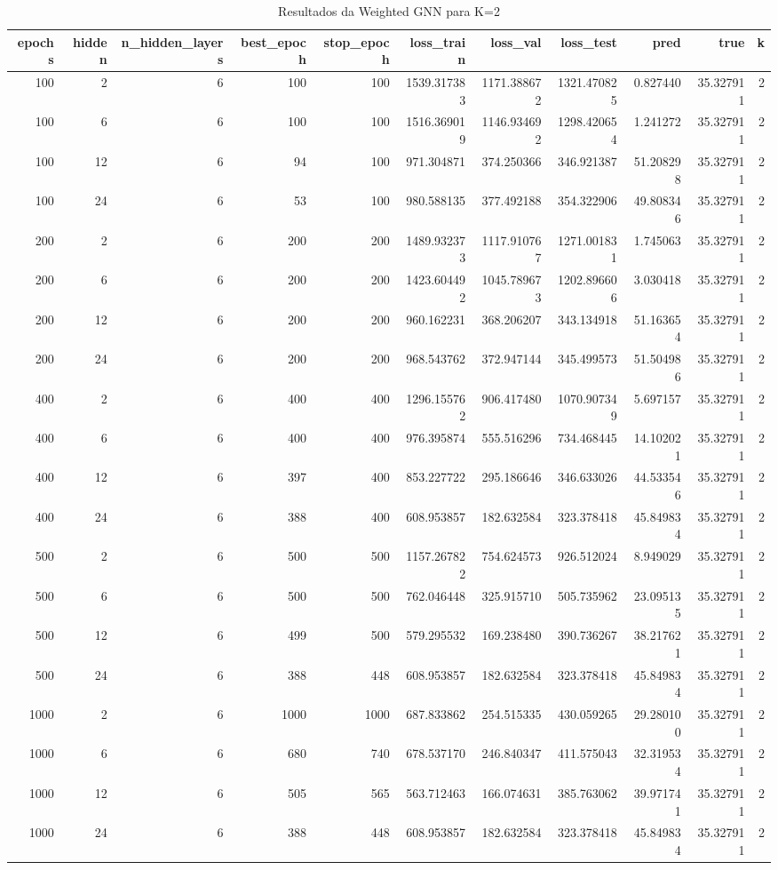\begin{table}
\caption{Resultados da Weighted GNN para K=2}
\label{tab:weighted_gnn_results_k2}
\begin{tabular}{rrrrrrrrrrr}
\toprule
epochs & hidden & n\_hidden\_layers & best\_epoch & stop\_epoch & loss\_train & loss\_val & loss\_test & pred & true & k \\
\midrule
100 & 2 & 6 & 100 & 100 & 1539.317383 & 1171.388672 & 1321.470825 & 0.827440 & 35.327911 & 2 \\
100 & 6 & 6 & 100 & 100 & 1516.369019 & 1146.934692 & 1298.420654 & 1.241272 & 35.327911 & 2 \\
100 & 12 & 6 & 94 & 100 & 971.304871 & 374.250366 & 346.921387 & 51.208298 & 35.327911 & 2 \\
100 & 24 & 6 & 53 & 100 & 980.588135 & 377.492188 & 354.322906 & 49.808346 & 35.327911 & 2 \\
200 & 2 & 6 & 200 & 200 & 1489.932373 & 1117.910767 & 1271.001831 & 1.745063 & 35.327911 & 2 \\
200 & 6 & 6 & 200 & 200 & 1423.604492 & 1045.789673 & 1202.896606 & 3.030418 & 35.327911 & 2 \\
200 & 12 & 6 & 200 & 200 & 960.162231 & 368.206207 & 343.134918 & 51.163654 & 35.327911 & 2 \\
200 & 24 & 6 & 200 & 200 & 968.543762 & 372.947144 & 345.499573 & 51.504986 & 35.327911 & 2 \\
400 & 2 & 6 & 400 & 400 & 1296.155762 & 906.417480 & 1070.907349 & 5.697157 & 35.327911 & 2 \\
400 & 6 & 6 & 400 & 400 & 976.395874 & 555.516296 & 734.468445 & 14.102021 & 35.327911 & 2 \\
400 & 12 & 6 & 397 & 400 & 853.227722 & 295.186646 & 346.633026 & 44.533546 & 35.327911 & 2 \\
400 & 24 & 6 & 388 & 400 & 608.953857 & 182.632584 & 323.378418 & 45.849834 & 35.327911 & 2 \\
500 & 2 & 6 & 500 & 500 & 1157.267822 & 754.624573 & 926.512024 & 8.949029 & 35.327911 & 2 \\
500 & 6 & 6 & 500 & 500 & 762.046448 & 325.915710 & 505.735962 & 23.095135 & 35.327911 & 2 \\
500 & 12 & 6 & 499 & 500 & 579.295532 & 169.238480 & 390.736267 & 38.217621 & 35.327911 & 2 \\
500 & 24 & 6 & 388 & 448 & 608.953857 & 182.632584 & 323.378418 & 45.849834 & 35.327911 & 2 \\
1000 & 2 & 6 & 1000 & 1000 & 687.833862 & 254.515335 & 430.059265 & 29.280100 & 35.327911 & 2 \\
1000 & 6 & 6 & 680 & 740 & 678.537170 & 246.840347 & 411.575043 & 32.319534 & 35.327911 & 2 \\
1000 & 12 & 6 & 505 & 565 & 563.712463 & 166.074631 & 385.763062 & 39.971741 & 35.327911 & 2 \\
1000 & 24 & 6 & 388 & 448 & 608.953857 & 182.632584 & 323.378418 & 45.849834 & 35.327911 & 2 \\
\bottomrule
\end{tabular}
\end{table}
